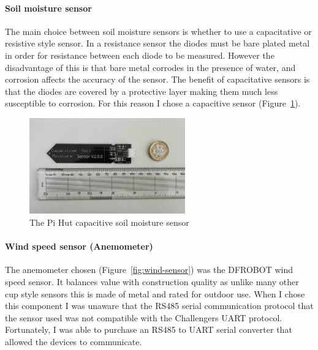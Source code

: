 \paragraph{Soil moisture sensor}

The main choice between soil moisture sensors is whether to use a capacitative
or resistive style sensor. In a resistance sensor the diodes must be bare plated
metal in order for resistance between each diode to be measured. However the
disadvantage of this is that bare metal corrodes in the presence of water, and
corrosion affects the accuracy of the sensor.  The benefit of capacitative
sensors is that the diodes are covered by a protective layer making them much
less susceptible to corrosion. For this reason I chose a capacitive sensor
(Figure~\ref{fig:soil-sensor}).


\begin{figure}[H]
    \centering
    \includegraphics[width=0.6\textwidth]{contents/part-2/fig2/soil-sensor.jpg}
    \caption{The Pi Hut capacitive soil moisture sensor}
    \label{fig:soil-sensor}
\end{figure}

\paragraph{Wind speed sensor (Anemometer)}\label{sec:anemometer}

The anemometer chosen (Figure~\ref{fig:wind-sensor}) was the DFROBOT wind speed
sensor. It balances value with construction quality as unlike many other cup
style sensors this is made of metal and rated for outdoor use. When I chose this
component I was unaware that the RS485 serial communication protocol that the
sensor used was not compatible with the Challengers UART protocol. Fortunately,
I was able to purchase an RS485 to UART serial converter that allowed the
devices to communicate.

